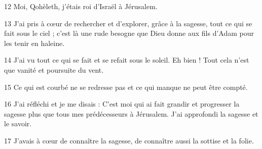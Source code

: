
12 Moi, Qohèleth, j’étais roi d’Israël à Jérusalem.

13 J’ai pris à cœur de rechercher et d’explorer, grâce à la sagesse, tout ce qui se fait sous le ciel ; c’est là une rude besogne que Dieu donne aux fils d’Adam pour les tenir en haleine.

14 J’ai vu tout ce qui se fait et se refait sous le soleil. Eh bien ! Tout cela n’est que vanité et poursuite du vent.

15 Ce qui est courbé ne se redresse pas et ce qui manque ne peut être compté.

16 J’ai réfléchi et je me disais : C’est moi qui ai fait grandir et progresser la sagesse plus que tous mes prédécesseurs à Jérusalem. J’ai approfondi la sagesse et le savoir.

17 J’avais à cœur de connaître la sagesse, de connaître aussi la sottise et la folie.